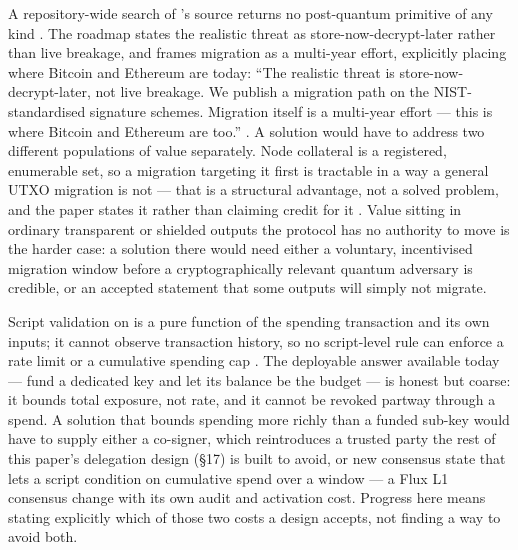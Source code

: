 \begin{openproblem}
A repository-wide search of \fluxd's source returns no post-quantum primitive of any kind
. The roadmap states the realistic threat as store-now-decrypt-later
rather than live breakage, and frames migration as a multi-year effort, explicitly placing \Flux where
Bitcoin and Ethereum are today: ``The realistic threat is store-now-decrypt-later, not live breakage.
We publish a migration path on the NIST-standardised signature schemes. Migration itself is a
multi-year effort — this is where Bitcoin and Ethereum are too.''
. A solution would have to address two different
populations of value separately. Node collateral is a registered, enumerable set, so a migration
targeting it first is tractable in a way a general UTXO migration is not — that is a structural
advantage, not a solved problem, and the paper states it rather than claiming credit for it
. Value sitting in ordinary transparent or shielded
outputs the protocol has no authority to move is the harder case: a solution there would need either
a voluntary, incentivised migration window before a cryptographically relevant quantum adversary is
credible, or an accepted statement that some outputs will simply not migrate.
\end{openproblem}

\begin{openproblem}
Script validation on \fluxd is a pure function of the spending transaction and its own inputs; it
cannot observe transaction history, so no script-level rule can enforce a rate limit or a cumulative
spending cap . The deployable answer available today — fund a
dedicated key and let its balance be the budget — is honest but coarse: it bounds total exposure, not
rate, and it cannot be revoked partway through a spend. A solution that bounds spending more richly
than a funded sub-key would have to supply either a co-signer, which reintroduces a trusted party the
rest of this paper's delegation design (§17) is built to avoid, or new consensus state that lets a
script condition on cumulative spend over a window — a Flux L1 consensus change with its own audit and
activation cost. Progress here means stating explicitly which of those two costs a design accepts, not
finding a way to avoid both.
\end{openproblem}

